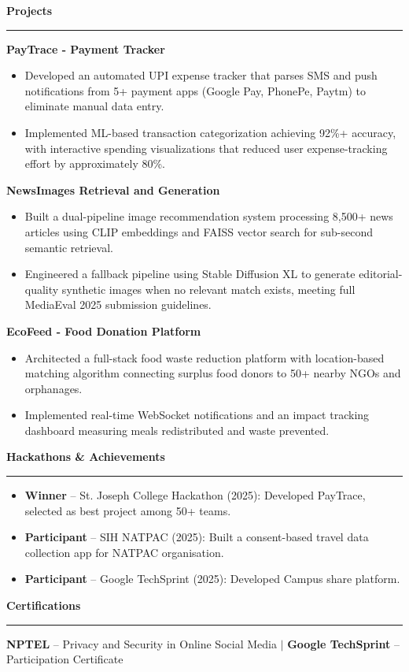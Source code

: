 \documentclass[12pt]{article}
\newcommand{\sectionhead}[1]{{\fontsize{12pt}{14pt}\selectfont\textbf{#1}}\vspace{2pt}\hrule\vspace{3pt}}
\begin{document}
\vspace{4pt}

\sectionhead{Projects}

\textbf{PayTrace - Payment Tracker}
\begin{itemize}
    \item Developed an automated UPI expense tracker that parses SMS and push notifications from 5+ payment apps (Google Pay, PhonePe, Paytm) to eliminate manual data entry.
    \item Implemented ML-based transaction categorization achieving 92\%+ accuracy, with interactive spending visualizations that reduced user expense-tracking effort by approximately 80\%.
\end{itemize}

\vspace{2pt}
\textbf{NewsImages Retrieval and Generation}
\begin{itemize}
    \item Built a dual-pipeline image recommendation system processing 8,500+ news articles using CLIP embeddings and FAISS vector search for sub-second semantic retrieval.
    \item Engineered a fallback pipeline using Stable Diffusion XL to generate editorial-quality synthetic images when no relevant match exists, meeting full MediaEval 2025 submission guidelines.
\end{itemize}

\vspace{2pt}
\textbf{EcoFeed - Food Donation Platform}
\begin{itemize}
    \item Architected a full-stack food waste reduction platform with location-based matching algorithm connecting surplus food donors to 50+ nearby NGOs and orphanages.
    \item Implemented real-time WebSocket notifications and an impact tracking dashboard measuring meals redistributed and waste prevented.
\end{itemize}

\vspace{4pt}

\sectionhead{Hackathons \& Achievements}

\begin{itemize}
    \item \textbf{Winner} -- St. Joseph College Hackathon (2025): Developed PayTrace, selected as best project among 50+ teams.
    \item \textbf{Participant} -- SIH NATPAC (2025): Built a consent-based travel data collection app for NATPAC organisation.
    \item \textbf{Participant} -- Google TechSprint (2025): Developed Campus share platform.
\end{itemize}

\vspace{4pt}

\sectionhead{Certifications}

\textbf{NPTEL} -- Privacy and Security in Online Social Media $|$ \textbf{Google TechSprint} -- Participation Certificate
\end{document}
